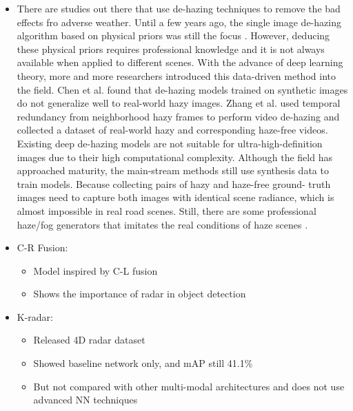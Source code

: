 \documentclass[rnd]{mas_proposal}
\begin{document}
\begin{itemize}
    \item There are studies out there that use de-hazing techniques to remove the bad effects fro adverse weather. Until a few years ago, the single image de-hazing algorithm based on physical priors was still the focus \cite{tan2008visibility} \cite{tarel2009fast}. However, deducing these physical priors requires professional knowledge and it is not always available when applied to different scenes. With the advance of deep learning theory, more and more researchers introduced this data-driven method into the field. Chen et al. \cite{chen2021psd} found that de-hazing models trained on synthetic images do not generalize well to real-world hazy images. Zhang et al. \cite{zhang2021learning} used temporal redundancy from neighborhood hazy frames to perform video de-hazing and collected a dataset of real-world hazy and corresponding haze-free videos. Existing deep de-hazing models are not suitable for ultra-high-definition images due to their high computational complexity. Although the field has approached maturity, the main-stream methods still use synthesis data to train models. Because collecting pairs of hazy and haze-free ground- truth images need to capture both images with identical scene radiance, which is almost impossible in real road scenes. Still, there are some professional haze/fog generators that imitates the real conditions of haze scenes \cite{musat2021multi} \cite{timofte2018ntire}.

    

    

    \item C-R Fusion:
    \cite{Nobis2020May}
    \begin{itemize}
        \item Model inspired by C-L fusion
        \item Shows the importance of radar in object detection
    \end{itemize}



    
    \item K-radar: 
    \cite{Paek2022Jun}
    \begin{itemize}
        \item Released 4D radar dataset
        \item Showed baseline network only, and mAP still 41.1\%
        \item But not compared with other multi-modal architectures and does not use advanced NN techniques 
    \end{itemize}
        

\end{itemize}
\end{document}
